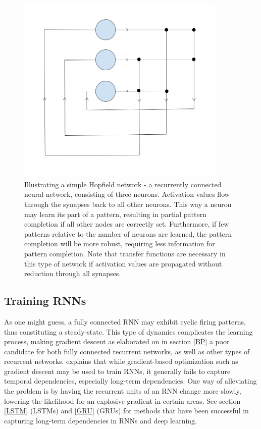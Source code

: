 \begin{figure}
\centering
\includegraphics[width=10cm]{fig/hopfield_net}
\caption{Illustrating a simple Hopfield network - a recurrently connected neural network, consisting of three neurons. Activation values flow through the synapses back to all other neurons. This way a neuron may learn its part of a pattern, resulting in partial pattern completion if all other nodes are correctly set. Furthermore, if few patterns relative to the number of neurons are learned, the pattern completion will be more robust, requiring less  information for pattern completion. Note that transfer functions are necessary in this type of network if activation values are propagated without reduction through all synapses.}
\label{fig:hopfield_net}
\end{figure}

\subsection{Training RNNs}

As one might guess, a fully connected RNN may exhibit cyclic firing patterns, thus constituting a steady-state. This type of dynamics complicates the learning process, making gradient descent as elaborated on in section \ref{BP} a poor candidate for both fully connected recurrent networks, as well as other types of recurrent networks. \cite{Bengio2013b} explains that while gradient-based optimization such as gradient descent may be used to train RNNs, it generally fails to capture temporal dependencies, especially long-term dependencies. One way of alleviating the problem is by having the recurrent units of an RNN change more slowly, lowering the likelihood for an explosive gradient in certain areas. See section \ref{LSTM} (LSTMs) and \ref{GRU} (GRUs) for methods that have been successful in capturing long-term dependencies in RNNs and deep learning.

